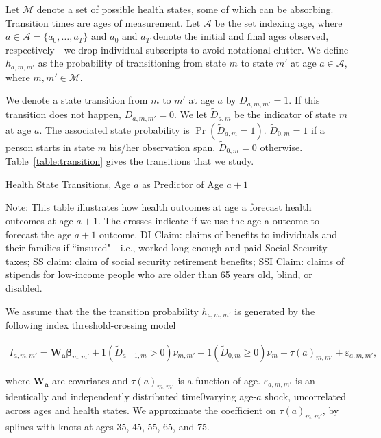 Let $\mathcal{M}$ denote a set of possible health states, some of which can be absorbing. Transition times are ages of measurement. Let $\mathcal{A}$ be the set indexing age, where $a \in \mathcal{A} = \{a_0, \ldots, a_T\}$ and $a_0$ and $a_T$ denote the initial and final ages observed, respectively---we drop individual subscripts to avoid notational clutter. We define $h_{a,m,m'}$ as the probability of transitioning from state $m$ to state $m'$ at age $a \in \mathcal{A}$, where $m, m' \in \mathcal{M}$.

We denote a state transition from $m$ to $m'$ at age $a$ by $D_{a,m,m'} = 1$. If this transition does not happen,  $D_{a,m,m'} = 0$. We let $\tilde{D}_{a,m}$ be the indicator of state $m$ at age $a$. The associated state probability is $\Pr \left( \tilde{D}_{a,m} = 1\right)$. $\tilde{D}_{0,m} = 1$ if a person starts in state $m$ his/her observation span. $\tilde{D}_{0,m} = 0$ otherwise. Table~\ref{table:transition} gives the transitions that we study.

\begin{table}
\begin{threeparttable}
\caption{Health State Transitions, Age $a$ as Predictor of Age $a+1$}\label{table:transition}
\scriptsize

{\flushleft\footnotesize
Note: This table illustrates how health outcomes at age a forecast health outcomes at age $a + 1$. The crosses indicate if we use the age a outcome to forecast the age $a + 1$ outcome. DI Claim: claims of benefits to individuals and their families if ``insured"---i.e., worked long enough and paid Social Security taxes; SS claim: claim of social security retirement benefits; SSI Claim: claims of stipends for low-income people who are older than 65 years old, blind, or disabled.}
\end{threeparttable}
\end{table}

We assume that the the transition probability $h_{a,m,m'}$ is generated by the following index threshold-crossing model

\begin{align}\label{eq:trans}
I_{a,m,m'} = \bm{W_a} \bm{\beta}_{m,m'} +\bm{\mathit{1}} \left( \tilde{D}_{a-1,m}>0\right) \nu_{m,m'}  + \bm{\mathit{1}} \left( \tilde{D}_{0,m}\geq 0 \right) \nu_{m}  +  \tau \left( a \right)_{m,m'} + \varepsilon_{a,m,m'},
\end{align}

\noindent where $\bm{W_a}$ are covariates and $\tau \left( a \right)_{m,m'}$ is a function of age. $\varepsilon_{a,m,m'}$ is an identically and independently distributed time0varying age-$a$ shock, uncorrelated across ages and health states. We approximate the coefficient on $\tau \left( a \right)_{m,m'}$, by splines with knots at ages 35, 45, 55, 65, and 75.

